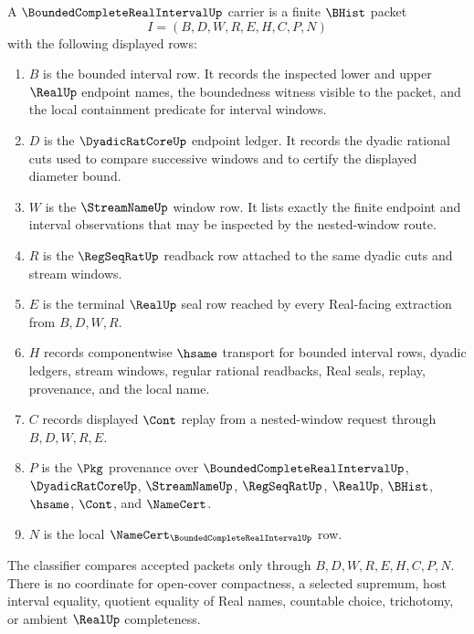 \begin{definition}
\label{def:bounded-complete-real-interval-carrier}
A $\BoundedCompleteRealIntervalUp$ carrier is a finite $\BHist$ packet
$$
I=(B,D,W,R,E,H,C,P,N)
$$
with the following displayed rows:
\begin{enumerate}
\item $B$ is the bounded interval row. It records the inspected lower and upper $\RealUp$ endpoint names, the boundedness witness visible to the packet, and the local containment predicate for interval windows.
\item $D$ is the $\DyadicRatCoreUp$ endpoint ledger. It records the dyadic rational cuts used to compare successive windows and to certify the displayed diameter bound.
\item $W$ is the $\StreamNameUp$ window row. It lists exactly the finite endpoint and interval observations that may be inspected by the nested-window route.
\item $R$ is the $\RegSeqRatUp$ readback row attached to the same dyadic cuts and stream windows.
\item $E$ is the terminal $\RealUp$ seal row reached by every Real-facing extraction from $B,D,W,R$.
\item $H$ records componentwise $\hsame$ transport for bounded interval rows, dyadic ledgers, stream windows, regular rational readbacks, Real seals, replay, provenance, and the local name.
\item $C$ records displayed $\Cont$ replay from a nested-window request through $B,D,W,R,E$.
\item $P$ is the $\Pkg$ provenance over $\BoundedCompleteRealIntervalUp$, $\DyadicRatCoreUp$, $\StreamNameUp$, $\RegSeqRatUp$, $\RealUp$, $\BHist$, $\hsame$, $\Cont$, and $\NameCert$.
\item $N$ is the local $\NameCert_{\BoundedCompleteRealIntervalUp}$ row.
\end{enumerate}
The classifier compares accepted packets only through $B,D,W,R,E,H,C,P,N$. There is no coordinate for open-cover compactness, a selected supremum, host interval equality, quotient equality of Real names, countable choice, trichotomy, or ambient $\RealUp$ completeness.
\end{definition}

